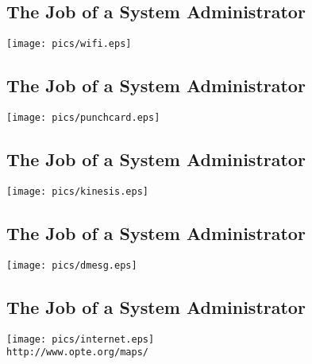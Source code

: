 \documentclass[xga]{xdvislides}
\begin{document}
\subsection{The Job of a System Administrator}
\vspace*{\fill}
\begin{center}
	\texttt{[image: pics/wifi.eps]} \\
\end{center}
\vspace*{\fill}

\subsection{The Job of a System Administrator}
\vspace*{\fill}
\begin{center}
	\texttt{[image: pics/punchcard.eps]} \\
\end{center}
\vspace*{\fill}

\subsection{The Job of a System Administrator}
\vspace*{\fill}
\begin{center}
	\texttt{[image: pics/kinesis.eps]} \\
\end{center}
\vspace*{\fill}

\subsection{The Job of a System Administrator}
\vspace*{\fill}
\begin{center}
	\texttt{[image: pics/dmesg.eps]} \\
\end{center}
\vspace*{\fill}

\subsection{The Job of a System Administrator}
\vspace*{\fill}
\begin{center}
	\texttt{[image: pics/internet.eps]} \\
	\small
	{\tt http://www.opte.org/maps/}
	\Normalsize
\end{center}
\vspace*{\fill}
\end{document}
